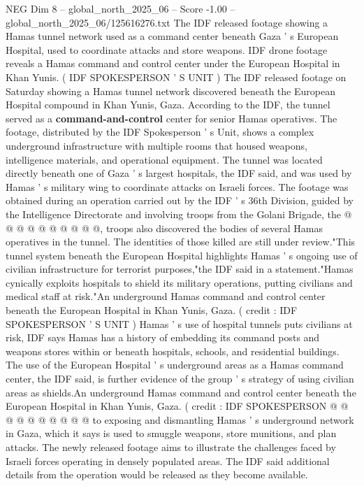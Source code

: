 \begin{textsample}{NEG Dim 8 – global\_north\_2025\_06 – Score -1.00 – global\_north\_2025\_06/125616276.txt}  \label{ex:f8_neg_399}
The IDF released footage showing a Hamas tunnel network used as a command center beneath Gaza ' s European Hospital, used to coordinate attacks and store weapons.
IDF drone footage reveals a Hamas command and control center under the European Hospital in Khan Yunis. ( IDF SPOKESPERSON ' S UNIT ) The IDF released footage on Saturday showing a Hamas tunnel network discovered beneath the European Hospital compound in Khan Yunis, Gaza.
According to the IDF, the tunnel served as a \textbf{command-and-control} center for senior Hamas operatives.
The footage, distributed by the IDF Spokesperson ' s Unit, shows a complex underground infrastructure with multiple rooms that housed weapons, intelligence materials, and operational equipment.
The tunnel was located directly beneath one of Gaza ' s largest hospitals, the IDF said, and was used by Hamas ' s military wing to coordinate attacks on Israeli forces.
The footage was obtained during an operation carried out by the IDF ' s 36th Division, guided by the Intelligence Directorate and involving troops from the Golani Brigade, the @ @ @ @ @ @ @ @ @ @, troops also discovered the bodies of several Hamas operatives in the tunnel.
The identities of those killed are still under review."This tunnel system beneath the European Hospital highlights Hamas ' s ongoing use of civilian infrastructure for terrorist purposes,"the IDF said in a statement."Hamas cynically exploits hospitals to shield its military operations, putting civilians and medical staff at risk."An underground Hamas command and control center beneath the European Hospital in Khan Yunis, Gaza. ( credit : IDF SPOKESPERSON ' S UNIT ) Hamas ' s use of hospital tunnels puts civilians at risk, IDF says Hamas has a history of embedding its command posts and weapons stores within or beneath hospitals, schools, and residential buildings.
The use of the European Hospital ' s underground areas as a Hamas command center, the IDF said, is further evidence of the group ' s strategy of using civilian areas as shields.An underground Hamas command and control center beneath the European Hospital in Khan Yunis, Gaza. ( credit : IDF SPOKESPERSON @ @ @ @ @ @ @ @ @ @ to exposing and dismantling Hamas ' s underground network in Gaza, which it says is used to smuggle weapons, store munitions, and plan attacks.
The newly released footage aims to illustrate the challenges faced by Israeli forces operating in densely populated areas.
The IDF said additional details from the operation would be released as they become available.

\end{textsample}
